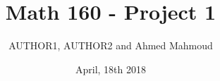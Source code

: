 \documentclass[12pt]{article}
\begin{document}
\title{Math 160 - Project 1}
\author{AUTHOR1, AUTHOR2 and Ahmed Mahmoud}
\date{April, 18th 2018} 

\maketitle

\newcommand{\cn}{Crank-Nicolson}




\newpage

%
\end{document}
